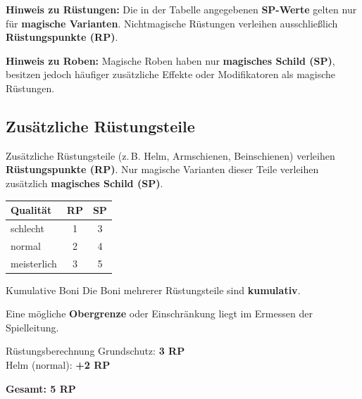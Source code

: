 \medskip

\textbf{Hinweis zu Rüstungen:}
Die in der Tabelle angegebenen \textbf{SP-Werte} gelten nur für
\textbf{magische Varianten}. Nichtmagische Rüstungen verleihen ausschließlich \textbf{Rüstungspunkte (RP)}.

\medskip
\textbf{Hinweis zu Roben:}
Magische Roben haben nur \textbf{magisches Schild (SP)}, besitzen jedoch häufiger zusätzliche Effekte oder Modifikatoren als magische Rüstungen.


\subsection*{Zusätzliche Rüstungsteile}

Zusätzliche Rüstungsteile (z.\,B. Helm, Armschienen, Beinschienen) verleihen  \textbf{Rüstungspunkte (RP)}.
Nur magische Varianten dieser Teile verleihen zusätzlich \textbf{magisches Schild (SP)}.

\medskip

\begin{center}
	\begin{tabular}{lcc}
		\toprule
		\textbf{Qualität} & \textbf{RP} & \textbf{SP} \\
		\midrule
		schlecht    & 1 & 3 \\
		normal      & 2 & 4 \\
		meisterlich & 3 & 5 \\
		\bottomrule
	\end{tabular}
\end{center}

\medskip

\begin{rulebox}{Kumulative Boni}
	Die Boni mehrerer Rüstungsteile sind \textbf{kumulativ}.
	
	Eine mögliche \textbf{Obergrenze} oder Einschränkung
	liegt im Ermessen der Spielleitung.
\end{rulebox}


\begin{examplebox}{Rüstungsberechnung}
	Grundschutz: \textbf{3 RP} \\
	Helm (normal): \textbf{+2 RP}
	
	\medskip
	\textbf{Gesamt: 5 RP}
\end{examplebox}

